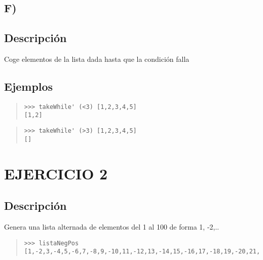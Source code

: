 \subsection{F)}
\begin{haddockdesc}
\item[\begin{tabular}{@{}l}
takeWhile' :: (a -> Bool) -> {\char 91}a{\char 93} -> {\char 91}a{\char 93}
\end{tabular}]
{\haddockbegindoc
\section*{Descripción}
Coge elementos de la lista dada hasta que la condición falla\par
\subsection*{Ejemplos}
\begin{quote}
{\haddockverb\begin{verbatim}
>>> takeWhile' (<3) [1,2,3,4,5]
[1,2]

\end{verbatim}}
\end{quote}
\begin{quote}
{\haddockverb\begin{verbatim}
>>> takeWhile' (>3) [1,2,3,4,5]
[]

\end{verbatim}}
\end{quote}}
\end{haddockdesc}
\section{EJERCICIO 2}
\begin{haddockdesc}
\item[\begin{tabular}{@{}l}
listaNegPos :: {\char 91}Integer{\char 93}
\end{tabular}]
{\haddockbegindoc
\section*{Descripción}
Genera una lista alternada de elementos del 1 al 100 de forma {}1, -2,..{}\par
\begin{quote}
{\haddockverb\begin{verbatim}
>>> listaNegPos
[1,-2,3,-4,5,-6,7,-8,9,-10,11,-12,13,-14,15,-16,17,-18,19,-20,21,-22,23,-24,25,-26,27,-28,29,-30,31,-32,33,-34,35,-36,37,-38,39,-40,41,-42,43,-44,45,-46,47,-48,49,-50,51,-52,53,-54,55,-56,57,-58,59,-60,61,-62,63,-64,65,-66,67,-68,69,-70,71,-72,73,-74,75,-76,77,-78,79,-80,81,-82,83,-84,85,-86,87,-88,89,-90,91,-92,93,-94,95,-96,97,-98,99,-100]

\end{verbatim}}
\end{quote}}
\end{haddockdesc}
